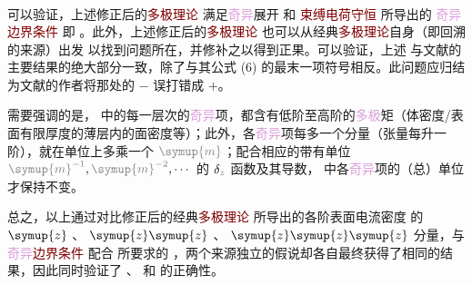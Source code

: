 \begin{subequations}
\begin{align}
\end{align}
\end{subequations}
可以验证，上述修正后的\textcolor{Maroon}{多极理论}  满足\textcolor{Plum}{奇异}展开  和 \textcolor{Maroon}{束缚电荷守恒}  所导出的 \textcolor{Plum}{奇异}\textcolor{Maroon}{边界条件}  即 。此外，上述修正后的\textcolor{Maroon}{多极理论}  也可以从经典\textcolor{Maroon}{多极理论}自身（即回溯  的来源）出发\cite{raabMultipoleTheoryElectromagnetism2004,delangeElectromagneticBoundaryConditions2013} 以找到问题所在，并修补之以得到正果。可以验证，上述  与文献\cite{delangeElectromagneticBoundaryConditions2013}的主要结果的绝大部分一致，除了与其公式 (6) 的最末一项符号相反。此问题应归结为文献\cite{delangeElectromagneticBoundaryConditions2013}的作者将那处的 $-$ 误打错成 $+$。

需要强调的是， 中的每一层次的\textcolor{Plum}{奇异}项，都含有低阶至高阶的\textcolor{Plum}{多极}矩（体密度/表面有限厚度的薄层内的面密度等）；此外，各\textcolor{Plum}{奇异}项每多一个分量（张量每升一阶），就在单位上多乘一个 $\mathcolor{gray}{\symup{m}}$；配合相应的带有单位 $\mathcolor{gray}{\symup{m}^{-1}},\mathcolor{gray}{\symup{m}^{-2}},\cdots$ 的 $\delta_{\mathcolor{gray}{z}}$ 函数及其导数， 中各\textcolor{Plum}{奇异}项的（总）单位才保持不变。

总之，以上通过对比修正后的经典\textcolor{Maroon}{多极理论}  所导出的各阶表面电流密度  的 $\symup{z}$ 、 $\symup{z} \symup{z}$ 、 $\symup{z} \symup{z} \symup{z}$ 分量，与\textcolor{Plum}{奇异}\textcolor{Maroon}{边界条件}  配合  所要求的 ，两个来源独立的假说却各自最终获得了相同的结果，因此同时验证了  、  和  的正确性。

